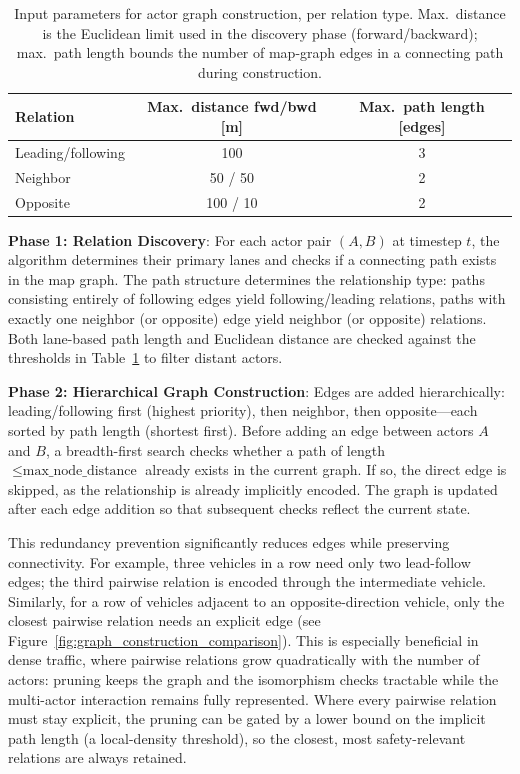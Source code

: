 \begin{table}[ht]
      \centering
      \caption{Input parameters for actor graph construction, per relation type. Max.\ distance is the Euclidean limit used in the discovery phase (forward/backward); max.\ path length bounds the number of map-graph edges in a connecting path during construction.}
      \label{tab:construction_parameters}
      \begin{tabular}{lcc}
      \toprule
      \textbf{Relation} & \textbf{Max.\ distance fwd/bwd [m]} & \textbf{Max.\ path length [edges]} \\
      \midrule
      Leading/following & 100 & 3 \\
      Neighbor          & 50 / 50 & 2 \\
      Opposite          & 100 / 10 & 2 \\
      \bottomrule
      \end{tabular}
      \end{table}
\textbf{Phase 1: Relation Discovery}: For each actor pair $(A, B)$ at timestep $t$, the algorithm determines their primary lanes and checks if a connecting path exists in the map graph. The path structure determines the relationship type: paths consisting entirely of following edges yield following/leading relations, paths with exactly one neighbor (or opposite) edge yield neighbor (or opposite) relations. Both lane-based path length and Euclidean distance are checked against the thresholds in Table~\ref{tab:construction_parameters} to filter distant actors.

\textbf{Phase 2: Hierarchical Graph Construction}: Edges are added hierarchically: leading/following first (highest priority), then neighbor, then opposite---each sorted by path length (shortest first). Before adding an edge between actors $A$ and $B$, a breadth-first search checks whether a path of length $\leq \text{max\_node\_distance}$ already exists in the current graph. If so, the direct edge is skipped, as the relationship is already implicitly encoded. The graph is updated after each edge addition so that subsequent checks reflect the current state.

This redundancy prevention significantly reduces edges while preserving connectivity. For example, three vehicles in a row need only two lead-follow edges; the third pairwise relation is encoded through the intermediate vehicle. Similarly, for a row of vehicles adjacent to an opposite-direction vehicle, only the closest pairwise relation needs an explicit edge (see Figure~\ref{fig:graph_construction_comparison}).
This is especially beneficial in dense traffic, where pairwise relations grow quadratically with the number of actors: pruning keeps the graph and the isomorphism checks tractable while the multi-actor interaction remains fully represented. Where every pairwise relation must stay explicit, the pruning can be gated by a lower bound on the implicit path length (a local-density threshold), so the closest, most safety-relevant relations are always retained.

